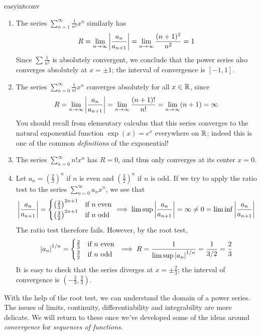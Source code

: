 \begin{examples}{}{easyintconv}
\begin{enumerate}
  \item The series $\sum\limits_{n=1}^\infty\frac 1{n^2}x^n$ similarly has
  \[R=\lim_{n\to\infty}\left| \frac{a_n}{a_{n+1}}\right|=\lim_{n\to\infty}\frac{(n+1)^2}{n^2}=1\]
	Since $\sum \frac 1{n^2}$ is absolutely convergent, we conclude that the power series also converges absolutely at $x=\pm 1$; the interval of convergence is $[-1,1]$.

	\item The series $\sum\limits_{n=0}^\infty \frac 1{n!}x^n$ converges absolutely for all $x\in\mathbb{R}$, since
  \[R=\lim_{n\to\infty}\left| \frac{a_n}{a_{n+1}}\right|=\lim_{n\to\infty}\frac{(n+1)!}{n!}=\lim_{n\to\infty}(n+1)=\infty\]
  You should recall from elementary calculus that this series converges to the natural exponential function $\exp(x)=e^x$ everywhere on $\mathbb{R}$; indeed this is one of the common \emph{definitions} of the exponential!

	\item The series $\sum\limits_{n=0}^\infty n!x^n$ has $R=0$, and thus only converges at its center $x=0$.

	\item\label{ex:easyintconv2} Let $a_n=\left(\frac 23\right)^n$ if $n$ is even and $\left(\frac 32\right)^n$ if $n$ is odd. If we try to apply the ratio test to the series $\sum\limits_{n=0}^\infty a_nx^n$, we see that
	\[\left| \frac{a_n}{a_{n+1}}\right|=
	\begin{cases}
	\left(\frac 23\right)^{2n+1}&\text{if $n$ even}\\
	\left(\frac 32\right)^{2n+1}&\text{if $n$ odd}
	\end{cases} \implies \limsup\left| \frac{a_n}{a_{n+1}}\right|=\infty\neq 0=\liminf\left| \frac{a_n}{a_{n+1}}\right|\]
	The ratio test therefore fails. However, by the root test,
	\[\left| a_n\right|^{1/n}=\begin{cases}
	\frac 23&\text{if $n$ even}\\
	\frac 32&\text{if $n$ odd}
	\end{cases}\ \implies R=\frac 1{\limsup\left| a_n\right|^{1/n}}=\frac 1{3/2}=\frac 23\]
	It is easy to check that the series diverges at $x=\pm\frac 23$; the interval of convergence is $(-\frac 23,\frac 23)$.
\end{enumerate}
\end{examples}\goodbreak

With the help of the root test, we can understand the domain of a power series. The issues of limits, continuity, differentiability and integrability are more delicate. We will return to these once we've developed some of the ideas around \emph{convergence} for \emph{sequences of functions.}

